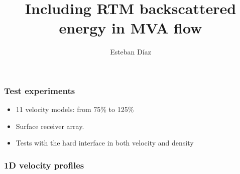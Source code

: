 

\title[]{Including RTM backscattered energy in MVA flow}
\subtitle{}
\author[]{Esteban  D\'{i}az}
\date{}
\logo{}

\def\big#1{\begin{center} \LARGE \textbf{#1} \end{center}}
\def\cen#1{\begin{center}        \textbf{#1} \end{center}}

 { \cwpcover }

\begin{frame} \frametitle{Test experiments}
\begin{itemize}
   \item 11 velocity models: from 75\% to 125\%
   \item Surface receiver array.
   \item Tests with the hard interface in both velocity and density
\end{itemize}
\end{frame}
\cwpnote{}


\begin{frame} \frametitle{1D velocity profiles}  \end{frame}



